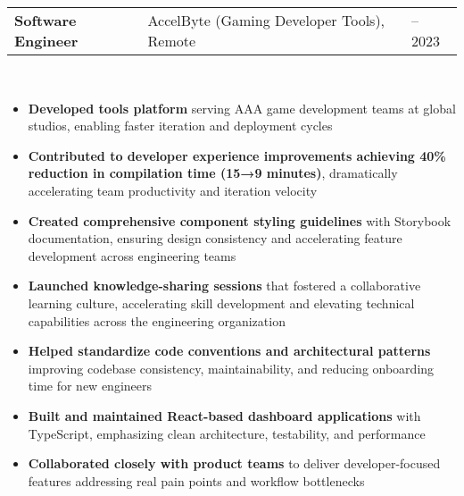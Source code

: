 \documentclass[a4paper, 11pt]{article}
\newcommand{\resumeItem}[1]{
  \item\small{
    {#1 \vspace{-2pt}}
  }
}
\newcommand{\resumeSubheading}[4]{
  \vspace{-2pt}\item
    \begin{tabularx}{0.987\textwidth}[t]{
  >{\raggedright\arraybackslash}X
  >{\centering\arraybackslash}X
  >{\raggedleft\arraybackslash}X }
      \textbf{#1} & #2 & #3 \\
    \end{tabularx}
    \textit{\small#4}\\
    \vspace{-7pt}
}
\newcommand{\resumeItemListStart}{\begin{itemize}[leftmargin=0.22in]}
\newcommand{\resumeItemListEnd}{\end{itemize}\vspace{-20pt}}
\begin{document}
        \resumeSubheading
            {Software Engineer}{AccelByte (Gaming Developer Tools), Remote}{2022 -- 2023}{}
            \resumeItemListStart
                \resumeItem{\textbf{Developed tools platform} serving AAA game development teams at global studios, enabling faster iteration and deployment cycles}
                \resumeItem{\textbf{Contributed to developer experience improvements achieving 40\% reduction in compilation time (15→9 minutes)}, dramatically accelerating team productivity and iteration velocity}
                \resumeItem{\textbf{Created comprehensive component styling guidelines} with Storybook documentation, ensuring design consistency and accelerating feature development across engineering teams}
                \resumeItem{\textbf{Launched knowledge-sharing sessions} that fostered a collaborative learning culture, accelerating skill development and elevating technical capabilities across the engineering organization}
                \resumeItem{\textbf{Helped standardize code conventions and architectural patterns} improving codebase consistency, maintainability, and reducing onboarding time for new engineers}
                \resumeItem{\textbf{Built and maintained React-based dashboard applications} with TypeScript, emphasizing clean architecture, testability, and performance}
                \resumeItem{\textbf{Collaborated closely with product teams} to deliver developer-focused features addressing real pain points and workflow bottlenecks}
            \resumeItemListEnd
\end{document}
